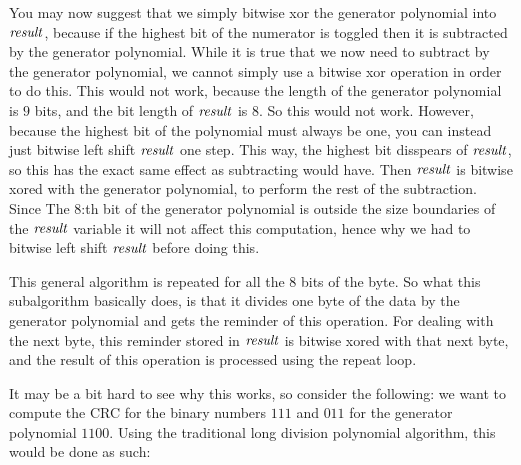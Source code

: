 You may now suggest that we simply bitwise xor the generator
polynomial into $\mathit{result}$, because if the highest bit of the numerator
is toggled then it is subtracted by the generator polynomial. While it
is true that we now need to subtract by the generator polynomial, we
cannot simply use a bitwise xor operation in order to do this. This
would not work, because the length of the generator polynomial is $9$
bits, and the bit length of $\mathit{result}$ is $8$. So this would not
work. However, because the highest bit of the polynomial must always
be one, you can instead just bitwise left shift $\mathit{result}$ one
step. This way, the highest bit disspears of $\mathit{result}$, so this has the
exact same effect as subtracting would have. Then $\mathit{result}$ is bitwise
xored with the generator polynomial, to perform the rest of the
subtraction. Since The $8$:th bit of the generator polynomial is
outside the size boundaries of the $\mathit{result}$ variable it will not
affect this computation, hence why we had to bitwise left shift
$\mathit{result}$ before doing this.

This general algorithm is repeated for all the 8 bits of the byte. So
what this subalgorithm basically does, is that it divides one byte of
the data by the generator polynomial and gets the reminder of this
operation. For dealing with the next byte, this reminder stored in
$\mathit{result}$ is bitwise xored with that next byte, and the result of this
operation is processed using the repeat loop.

It may be a bit hard to see why this works, so consider the following:
we want to compute the CRC for the binary numbers $111$ and $011$ for
the generator polynomial $1100$. Using the traditional long division
polynomial algorithm, this would be done as such:

